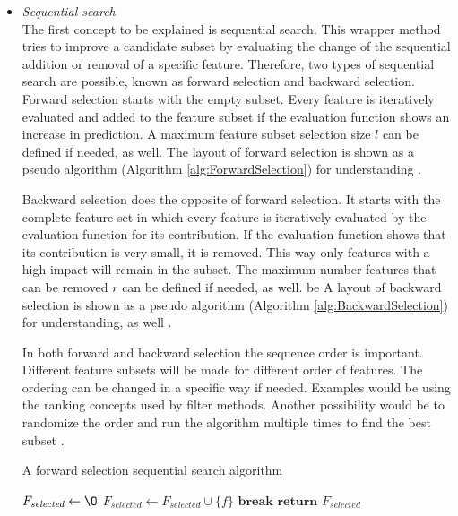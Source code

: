 \documentclass[10pt,a4paper]{report}
\begin{document}
	\begin{itemize}
		\item \textit{Sequential search} \\
		The first concept to be explained is sequential search. This wrapper method tries to improve a candidate subset by evaluating the change of the sequential addition or removal of a specific feature. Therefore, two types of sequential search are possible, known as forward selection and backward selection. Forward selection starts with the empty subset. Every feature is iteratively evaluated and added to the feature subset if the evaluation function shows an increase in prediction. A maximum feature subset selection size $l$ can be defined if needed, as well. The layout of forward selection is shown as a pseudo algorithm (Algorithm \ref{alg:ForwardSelection}) for understanding \cite{Reunanen2006}.
		
		Backward selection does the opposite of forward selection. It starts with the complete feature set in which every feature is iteratively evaluated by the evaluation function for its contribution. If the evaluation function shows that its contribution is very small, it is removed. This way only features with a high impact will remain in the subset. The maximum number features that can be removed $r$ can be defined if needed, as well. be A layout of backward selection is shown as a pseudo algorithm (Algorithm \ref{alg:BackwardSelection}) for understanding, as well \cite{Reunanen2006}.
		
		In both forward and backward selection the sequence order is important. Different feature subsets will be made for different order of features. The ordering can be changed in a specific way if needed. Examples would be using the ranking concepts used by filter methods. Another possibility would be to randomize the order and run the algorithm multiple times to find the best subset \cite{Reunanen2006}.
		
		\begin{algorithm}[H]
			\caption{A forward selection sequential search algorithm \cite{Reunanen2006}}\label{alg:ForwardSelection}
			\begin{algorithmic}[1]
				\State $F_{\textit{selected}} \gets \O$				
											
					
				\State $F_{\textit{selected}} \gets F_{\textit{selected}} \cup \{f\}$	
				\EndIf
						
				\State $\textbf{break}$
				\EndIf
				\EndFor
				\State $\textbf{return } F_{\textit{selected}}$
				\EndProcedure
			\end{algorithmic}
		\end{algorithm}
		

\end{itemize}
\end{document}
